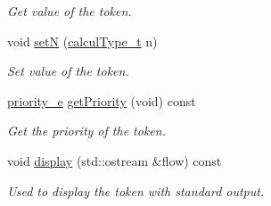 \begin{DoxyCompactItemize}
\begin{DoxyCompactList}\small\item\em Get value of the token. \end{DoxyCompactList}\item 
\hypertarget{class_token_af3149fcdb502bbd0c4813b50ad898e2a}{}void \hyperlink{class_token_af3149fcdb502bbd0c4813b50ad898e2a}{set\+N} (\hyperlink{mpfr_interface_8h_a993860352aef57b15399903c4475a608}{calcul\+Type\+\_\+t} n)\label{class_token_af3149fcdb502bbd0c4813b50ad898e2a}

\begin{DoxyCompactList}\small\item\em Set value of the token. \end{DoxyCompactList}\item 
\hypertarget{class_token_a87c0015a5a932014b9de9fa0441988ea}{}\hyperlink{token_8h_add90230972b81fc8809dc185a06a9b2a}{priority\+\_\+e} \hyperlink{class_token_a87c0015a5a932014b9de9fa0441988ea}{get\+Priority} (void) const \label{class_token_a87c0015a5a932014b9de9fa0441988ea}

\begin{DoxyCompactList}\small\item\em Get the priority of the token. \end{DoxyCompactList}\item 
\hypertarget{class_token_a04cb002bc8a1ca11487fa254a4455bf9}{}void \hyperlink{class_token_a04cb002bc8a1ca11487fa254a4455bf9}{display} (std\+::ostream \&flow) const \label{class_token_a04cb002bc8a1ca11487fa254a4455bf9}

\begin{DoxyCompactList}\small\item\em Used to display the token with standard output. \end{DoxyCompactList}\end{DoxyCompactItemize}

